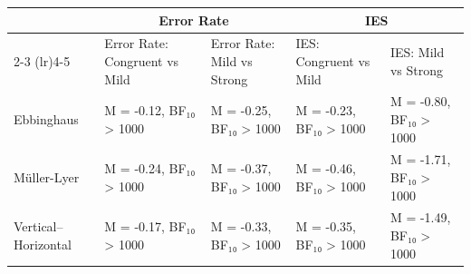 \begin{table}[t]
\fontsize{12.0pt}{14.0pt}\selectfont
\begin{tabular*}{\linewidth}{@{\extracolsep{\fill}}l|llll}
\toprule
 & \multicolumn{2}{c}{{Error Rate}} & \multicolumn{2}{c}{{IES}} \\ 
\cmidrule(lr){2-3} \cmidrule(lr){4-5}
 & Error Rate: Congruent vs Mild & Error Rate: Mild vs Strong & IES: Congruent vs Mild & IES: Mild vs Strong \\ 
\midrule\addlinespace[2.5pt]
Ebbinghaus & M = -0.12, BF₁₀ > 1000 & M = -0.25, BF₁₀ > 1000 & M = -0.23, BF₁₀ > 1000 & M = -0.80, BF₁₀ > 1000 \\ 
Müller-Lyer & M = -0.24, BF₁₀ > 1000 & M = -0.37, BF₁₀ > 1000 & M = -0.46, BF₁₀ > 1000 & M = -1.71, BF₁₀ > 1000 \\ 
Vertical–Horizontal & M = -0.17, BF₁₀ > 1000 & M = -0.33, BF₁₀ > 1000 & M = -0.35, BF₁₀ > 1000 & M = -1.49, BF₁₀ > 1000 \\ 
\bottomrule
\end{tabular*}
\end{table}

